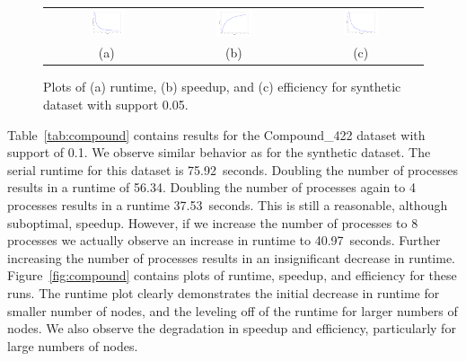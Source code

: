 \begin{figure}[H]
\centering
\begin{tabular}{ccc}
\includegraphics[width=0.3\textwidth]{synth_time.png} &
\includegraphics[width=0.3\textwidth]{synth_speedup.png} &
\includegraphics[width=0.3\textwidth]{synth_efficiency.png} \\
(a) & (b) & (c) \\
\end{tabular}
\caption{Plots of (a) runtime, (b) speedup, and (c) efficiency for
         synthetic dataset with support 0.05.}
\label{fig:synth}
\end{figure}

Table~\ref{tab:compound} contains results for the Compound\_422 dataset with
support of 0.1. We observe similar behavior as for the synthetic dataset. The
serial runtime for this dataset is 75.92~seconds. Doubling the number of
processes results in a runtime of 56.34. Doubling the number of processes again
to 4 processes results in a runtime 37.53~seconds. This is still a reasonable,
although suboptimal, speedup. However, if we increase the number of processes
to 8 processes we actually observe an increase in runtime to 40.97~seconds.
Further increasing the number of processes results in an insignificant decrease
in runtime.
Figure~\ref{fig:compound} contains plots of runtime, speedup, and efficiency
for these runs. The runtime plot clearly demonstrates the initial decrease in
runtime for smaller number of nodes, and the leveling off of the runtime for larger
numbers of nodes. We also observe the degradation in speedup and efficiency,
particularly for large numbers of nodes.


